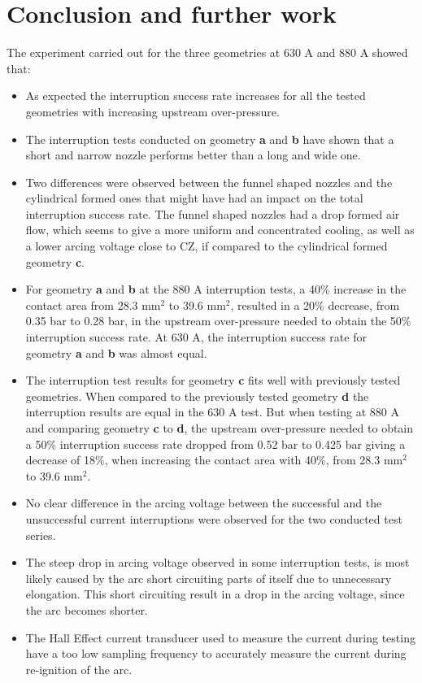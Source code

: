 \documentclass[10pt,b5paper,twoside]{article}
\begin{document}
\section{Conclusion and further work}
The experiment carried out for the three geometries at 630 A and 880 A showed that:
\begin{itemize}
\item As expected the interruption success rate increases for all the tested geometries with increasing upstream over-pressure. 

\item The interruption tests conducted on geometry \textbf{a} and \textbf{b} have shown that a short and narrow nozzle performs better than a long and wide one.

\item Two differences were observed between the funnel shaped nozzles and the cylindrical formed ones that might have had an impact on the total interruption success rate. The funnel shaped nozzles had a drop formed air flow, which seems to give a more uniform and concentrated cooling, as well as a lower arcing voltage close to CZ, if compared to the cylindrical formed geometry \textbf{c}.

\item For geometry \textbf{a} and \textbf{b} at the 880 A interruption tests, a 40\% increase in the contact area from 28.3 mm$^2$ to 39.6 mm$^2$, resulted in a 20\% decrease, from 0.35 bar to 0.28 bar, in the upstream over-pressure needed to obtain the 50\% interruption success rate. At 630 A, the interruption success rate for geometry \textbf{a} and \textbf{b} was almost equal.

\item The interruption test results for geometry \textbf{c} fits well with previously tested geometries. When compared to the previously tested geometry \textbf{d} the interruption results are equal in the 630 A test. But when testing at 880 A and comparing geometry \textbf{c} to \textbf{d}, the upstream over-pressure needed to obtain a 50\% interruption success rate dropped from 0.52 bar to 0.425 bar giving a decrease of 18\%, when increasing the contact area with 40\%, from 28.3 mm$^2$ to 39.6 mm$^2$.

\item No clear difference in the arcing voltage between the successful and the unsuccessful current interruptions were observed for the two conducted test series.

\item The steep drop in arcing voltage observed in some interruption tests, is most likely caused by the arc short circuiting parts of itself due to unnecessary elongation. This short circuiting result in a drop in the arcing voltage, since the arc becomes shorter.

\item The Hall Effect current transducer used to measure the current during testing have a too low sampling frequency to accurately measure the current during re-ignition of the arc.
\end{itemize}
\end{document}

